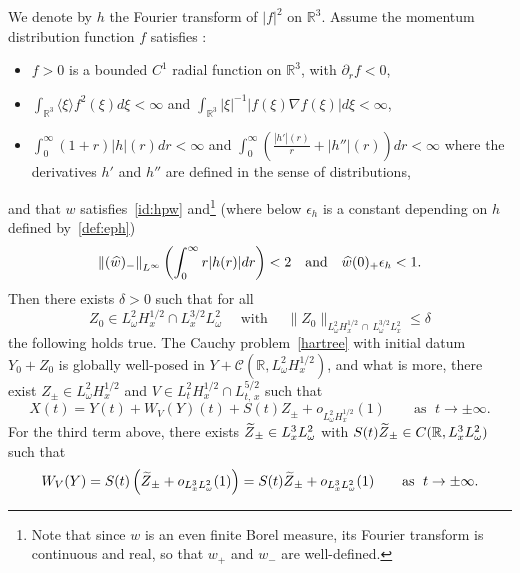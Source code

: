 \documentclass[AHL, Unicode, longabstracts,published]{cedram}
\newcommand{\R}{\mathbb{R}}
\newcommand{\mclC}{\mathcal{C}}
\let\oldtilde\tilde
\renewcommand*{\tilde}[1]{\mathchoice{\widetilde{#1}}{\widetilde{#1}}{\oldtilde{#1}}{\oldtilde{#1}}}
\let\oldhat\hat
\renewcommand*{\hat}[1]{\mathchoice{\widehat{#1}}{\widehat{#1}}{\oldhat{#1}}{\oldhat{#1}}}
\begin{document}
\begin{theo}\label{th:main}
We denote by $h$ the Fourier transform of $|f|^2$ on $\R^3$.
Assume the momentum distribution function $f$ satisfies :
\begin{itemize}
\item $f>0$ is a bounded $C^1$ radial function on $\R^3$, with $\partial_r f<0$,
\item $\int_{\R^3} \langle \xi \rangle f^2(\xi)d\xi<\infty$ and $\int_{\R^3}|\xi|^{-1} |f(\xi)\nabla f(\xi)|d\xi < \infty$,
\item $\int_0^\infty (1+r)|h|(r)dr<\infty$ and $\int_0^\infty (\tfrac{|h'|(r)}{r}+|h''|(r))dr<\infty$ where the derivatives $h'$ and $h''$ are defined in the sense of distributions,
\end{itemize}
and that $w$ satisfies~\eqref{id:hpw} and\footnote{Note that since $w$ is an even finite Borel measure, its Fourier transform is continuous and real, so that $w_+$ and $w_-$ are well-defined.} (where below $\epsilon_h$ is a constant depending on $h$ defined by~\eqref{def:eph})
\[
\left\| (\hat w)_-\right\|_{L^{\infty}}\left(\int_{0}^{\infty} r|h(r)|dr\right)<2 \quad \text{and} \quad \hat w (0)_+ \epsilon_h <1.
\]
Then there exists $\delta>0$ such that for all
\[
Z_0\in L^2_\omega H^{1/2}_x \cap L^{3/2}_{x}L^2_\omega\quad\text{ with }\quad\| Z_0\|_{L^2_\omega H^{1/2}_x\,\cap\,L^{3/2}_{\omega}L^2_x}\leq \delta
\]
the following holds true. The Cauchy problem~\eqref{hartree} with initial datum $Y_0+Z_0$ is globally well-posed in $Y + \mclC (\R, L^2_\omega H^{1/2}_x)$, and what is more, there exist $Z_\pm \in L^2_\omega H^{1/2}_x$ and $V\in L^{2}_{t}H^{1/2}_x\cap L^{5/2}_{t,\,x}$ such that
\begin{equation} \label{id:mainresult}
X(t) = Y(t) + W_V(Y)(t) +S(t) Z_\pm +o_{L^2_\omega H^{1/2}_x}(1) \qquad \text{as }\; t\rightarrow \pm \infty.
\end{equation} For the third term above, there exists $\tilde Z_\pm \in L^3_x L^2_\omega$ with $S(t) \tilde Z_\pm \in C(\R,L^3_x L^2_\omega)$ such that
\begin{equation} \label{id:mainresult2}
W_V(Y) = S(t) \left(\tilde Z_\pm + o_{L^3_x L^2_\omega}(1) \right)= S(t) \tilde Z_\pm + o_{L^3_xL^2_\omega} (1) \qquad\text{as }\; t\rightarrow \pm \infty.
\end{equation}
\end{theo}
\end{document}
